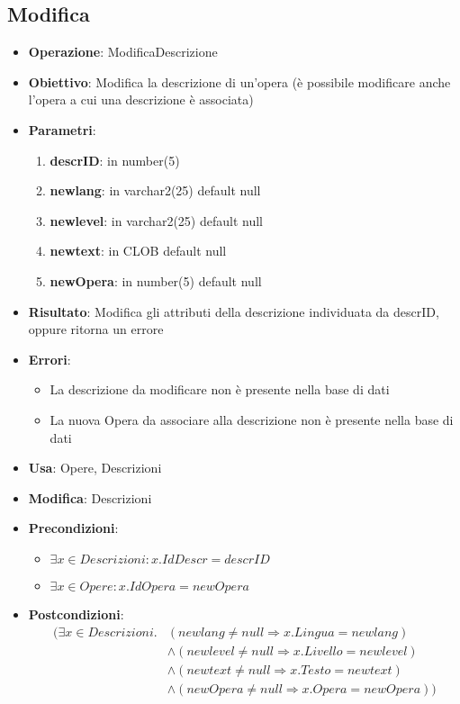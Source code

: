 \subsection{Modifica}
\begin{itemize}
	\item \textbf{Operazione}: ModificaDescrizione
	\item \textbf{Obiettivo}: Modifica la descrizione di un'opera (è possibile modificare anche l'opera a cui una descrizione è associata)
	\item \textbf{Parametri}:
	\begin{enumerate}
		\item \textbf{descrID}: in number(5)
		\item \textbf{newlang}: in varchar2(25) default null
		\item \textbf{newlevel}: in varchar2(25) default null
		\item \textbf{newtext}: in CLOB default null
		\item \textbf{newOpera}: in number(5) default null
	\end{enumerate}
	\item \textbf{Risultato}: Modifica gli attributi della descrizione individuata da descrID, oppure ritorna un errore
	\item \textbf{Errori}: 
	\begin{itemize}
		\item La descrizione da modificare non è presente nella base di dati
		\item La nuova Opera da associare alla descrizione non è presente nella base di dati
	\end{itemize}
	\item \textbf{Usa}: Opere, Descrizioni
	\item \textbf{Modifica}: Descrizioni
	\item \textbf{Precondizioni}:
	\begin{itemize}
		\item $\exists x \in Descrizioni : x.IdDescr = descrID$
		\item $\exists x \in Opere : x.IdOpera = newOpera$
	\end{itemize}
	\item \textbf{Postcondizioni}:
	\begin{align*} (\exists x \in Descrizioni.
		& (newlang \ne null \Rightarrow x.Lingua = newlang) \\
		& \land (newlevel \ne null \Rightarrow x.Livello = newlevel) \\
		& \land (newtext \ne null \Rightarrow x.Testo = newtext) \\
		& \land (newOpera \ne null \Rightarrow x.Opera = newOpera))
	\end{align*}
\end{itemize}

